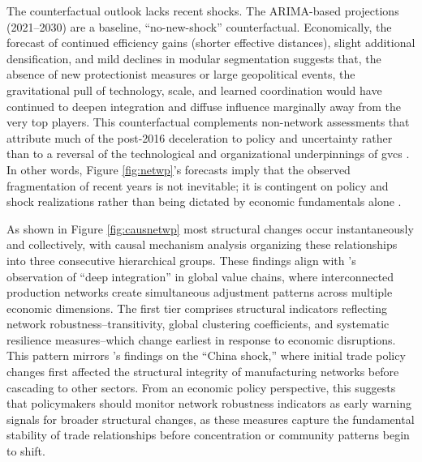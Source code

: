 \documentclass[preprint, 3p,
authoryear]{elsarticle} %
\begin{document}
The counterfactual outlook lacks recent shocks. The ARIMA-based
projections (2021--2030) are a baseline, ``no-new-shock''
counterfactual. Economically, the forecast of continued efficiency gains
(shorter effective distances), slight additional densification, and mild
declines in modular segmentation suggests that, the absence of new
protectionist measures or large geopolitical events, the gravitational
pull of technology, scale, and learned coordination would have continued
to deepen integration and diffuse influence marginally away from the
very top players. This counterfactual complements non-network
assessments that attribute much of the post-2016 deceleration to policy
and uncertainty rather than to a reversal of the technological and
organizational underpinnings of \glspl{gvc}
\citep{constantinescu2020global}. In other words, Figure
\ref{fig:netwp}'s forecasts imply that the observed fragmentation of
recent years is not inevitable; it is contingent on policy and shock
realizations rather than being dictated by economic fundamentals alone
\citep{milberg2024globalization}.

As shown in Figure \ref{fig:causnetwp} most structural changes occur
instantaneously and collectively, with causal mechanism analysis
organizing these relationships into three consecutive hierarchical
groups. These findings align with \citet{baldwin2015supply}'s
observation of ``deep integration'' in global value chains, where
interconnected production networks create simultaneous adjustment
patterns across multiple economic dimensions. The first tier comprises
structural indicators reflecting network robustness--transitivity,
global clustering coefficients, and systematic resilience
measures--which change earliest in response to economic disruptions.
This pattern mirrors \citet{autor2016china}'s findings on the ``China
shock,'' where initial trade policy changes first affected the
structural integrity of manufacturing networks before cascading to other
sectors. From an economic policy perspective, this suggests that
policymakers should monitor network robustness indicators as early
warning signals for broader structural changes, as these measures
capture the fundamental stability of trade relationships before
concentration or community patterns begin to shift.
\end{document}
